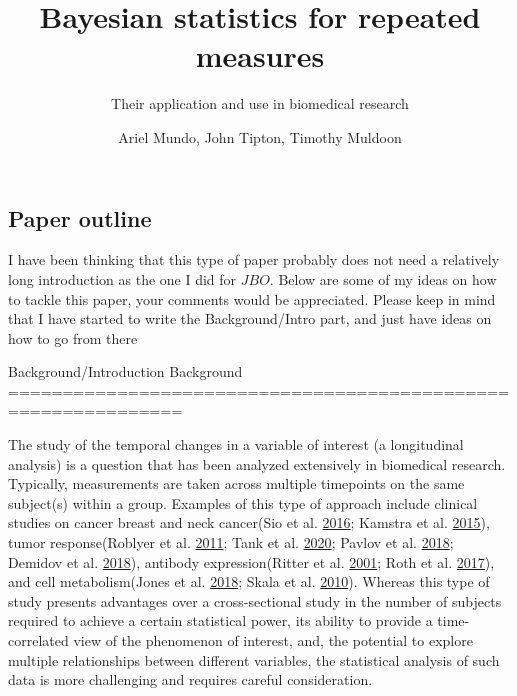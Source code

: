 \documentclass[
]{article}
\title{Bayesian statistics for repeated measures}
\subtitle{Their application and use in biomedical research}
\author{Ariel Mundo, John Tipton, Timothy Muldoon}
\date{}
\begin{document}
\maketitle

\hypertarget{paper-outline}{%
\subsection{Paper outline}\label{paper-outline}}

{I have been thinking that this type of paper probably does not need a
relatively long introduction as the one I did for \(JBO\). Below are
some of my ideas on how to tackle this paper, your comments would be
appreciated. Please keep in mind that I have started to write the
Background/Intro part, and just have ideas on how to go from there}

Background/Introduction Background
==============================================================

The study of the temporal changes in a variable of interest (a
longitudinal analysis) is a question that has been analyzed extensively
in biomedical research. Typically, measurements are taken across
multiple timepoints on the same subject(s) within a group. Examples of
this type of approach include clinical studies on cancer breast and neck
cancer(Sio et al. \protect\hyperlink{ref-sio2016}{2016}; Kamstra et al.
\protect\hyperlink{ref-kamstra2015}{2015}), tumor response(Roblyer et
al. \protect\hyperlink{ref-roblyer2011}{2011}; Tank et al.
\protect\hyperlink{ref-tank2020}{2020}; Pavlov et al.
\protect\hyperlink{ref-pavlov2018}{2018}; Demidov et al.
\protect\hyperlink{ref-demidov2018}{2018}), antibody expression(Ritter
et al. \protect\hyperlink{ref-ritter2001}{2001}; Roth et al.
\protect\hyperlink{ref-roth2017}{2017}), and cell metabolism(Jones et
al. \protect\hyperlink{ref-jones2018}{2018}; Skala et al.
\protect\hyperlink{ref-skala2010}{2010}). Whereas this type of study
presents advantages over a cross-sectional study in the number of
subjects required to achieve a certain statistical power, its ability to
provide a time-correlated view of the phenomenon of interest, and, the
potential to explore multiple relationships between different variables,
the statistical analysis of such data is more challenging and requires
careful consideration.
\end{document}

